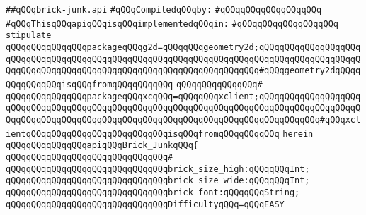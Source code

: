 \label{src/lib/x-kit/tut/badbricks-game/brick-junk.api}
\verb|##qQQqbrick-junk.api|\newline
\newline
\verb|#qQQqCompiledqQQqby:|\newline
\verb|#qQQqqQQqqQQqqQQqqQQq|\newline
\newline
\verb|#qQQqThisqQQqapiqQQqisqQQqimplementedqQQqin:|\newline
\verb|#qQQqqQQqqQQqqQQqqQQq|\newline
\newline
\verb|stipulate|\newline
\verb|qQQqqQQqqQQqqQQqpackageqQQqg2d=qQQqqQQqgeometry2d;qQQqqQQqqQQqqQQqqQQqqQQqqQQqqQQqqQQqqQQqqQQqqQQqqQQqqQQqqQQqqQQqqQQqqQQqqQQqqQQqqQQqqQQqqQQqqQQqqQQqqQQqqQQqqQQqqQQqqQQqqQQqqQQqqQQqqQQqqQQq#qQQqgeometry2dqQQqqQQqqQQqqQQqisqQQqfromqQQqqQQqqQQq|\newline
\verb|qQQqqQQqqQQqqQQq#|\newline
\verb|qQQqqQQqqQQqqQQqpackageqQQqxcqQQq=qQQqqQQqxclient;qQQqqQQqqQQqqQQqqQQqqQQqqQQqqQQqqQQqqQQqqQQqqQQqqQQqqQQqqQQqqQQqqQQqqQQqqQQqqQQqqQQqqQQqqQQqqQQqqQQqqQQqqQQqqQQqqQQqqQQqqQQqqQQqqQQqqQQqqQQqqQQqqQQqqQQq#qQQqxclientqQQqqQQqqQQqqQQqqQQqqQQqqQQqisqQQqfromqQQqqQQqqQQq|\newline
\verb|herein|\newline
\newline
\verb|qQQqqQQqqQQqqQQqapiqQQqBrick_JunkqQQq{|\newline
\verb|qQQqqQQqqQQqqQQqqQQqqQQqqQQqqQQq#|\newline
\verb|qQQqqQQqqQQqqQQqqQQqqQQqqQQqqQQqbrick_size_high:qQQqqQQqInt;|\newline
\verb|qQQqqQQqqQQqqQQqqQQqqQQqqQQqqQQqbrick_size_wide:qQQqqQQqInt;|\newline
\newline
\verb|qQQqqQQqqQQqqQQqqQQqqQQqqQQqqQQqbrick_font:qQQqqQQqString;|\newline
\newline
\verb|qQQqqQQqqQQqqQQqqQQqqQQqqQQqqQQqDifficultyqQQq=qQQqEASY|\newline
